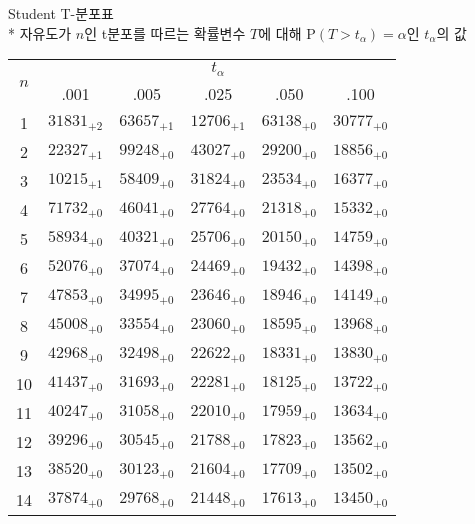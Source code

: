 \documentclass[10pt, a4paper]{article}
\begin{document}
\begin{center}
    \huge{Student T-분포표}\normalsize\\
    * 자유도가 \(n\)인 t분포를 따르는 확률변수 \(T\)에 대해 \(\mathrm{P}\left(T > t_\alpha\right) = \alpha\)인 \(t_\alpha\)의 값\\
    \begin{tabular}{c || c c c c c}
        \multirow{2}{*}{\(n\)} & \multicolumn{5}{c}{\(t_\alpha\)}\\
                        & .001 & .005 & .025 & .050 & .100\\
        \hline\hline
        1 & \({31831}_{+2}\) & \({63657}_{+1}\) & \({12706}_{+1}\) & \({63138}_{+0}\) & \({30777}_{+0}\)\\
        2 & \({22327}_{+1}\) & \({99248}_{+0}\) & \({43027}_{+0}\) & \({29200}_{+0}\) & \({18856}_{+0}\)\\
        3 & \({10215}_{+1}\) & \({58409}_{+0}\) & \({31824}_{+0}\) & \({23534}_{+0}\) & \({16377}_{+0}\)\\
        4 & \({71732}_{+0}\) & \({46041}_{+0}\) & \({27764}_{+0}\) & \({21318}_{+0}\) & \({15332}_{+0}\)\\
        5 & \({58934}_{+0}\) & \({40321}_{+0}\) & \({25706}_{+0}\) & \({20150}_{+0}\) & \({14759}_{+0}\)\\
        \hline
        6 & \({52076}_{+0}\) & \({37074}_{+0}\) & \({24469}_{+0}\) & \({19432}_{+0}\) & \({14398}_{+0}\)\\
        7 & \({47853}_{+0}\) & \({34995}_{+0}\) & \({23646}_{+0}\) & \({18946}_{+0}\) & \({14149}_{+0}\)\\
        8 & \({45008}_{+0}\) & \({33554}_{+0}\) & \({23060}_{+0}\) & \({18595}_{+0}\) & \({13968}_{+0}\)\\
        9 & \({42968}_{+0}\) & \({32498}_{+0}\) & \({22622}_{+0}\) & \({18331}_{+0}\) & \({13830}_{+0}\)\\
        10 & \({41437}_{+0}\) & \({31693}_{+0}\) & \({22281}_{+0}\) & \({18125}_{+0}\) & \({13722}_{+0}\)\\
        \hline
        11 & \({40247}_{+0}\) & \({31058}_{+0}\) & \({22010}_{+0}\) & \({17959}_{+0}\) & \({13634}_{+0}\)\\
        12 & \({39296}_{+0}\) & \({30545}_{+0}\) & \({21788}_{+0}\) & \({17823}_{+0}\) & \({13562}_{+0}\)\\
        13 & \({38520}_{+0}\) & \({30123}_{+0}\) & \({21604}_{+0}\) & \({17709}_{+0}\) & \({13502}_{+0}\)\\
        14 & \({37874}_{+0}\) & \({29768}_{+0}\) & \({21448}_{+0}\) & \({17613}_{+0}\) & \({13450}_{+0}\)\\

\end{tabular}
\end{center}
\end{document}
